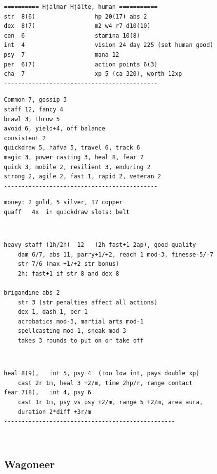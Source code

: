 \goodbreak \small \begin{samepage} \begin{verbatim}
========== Hjalmar Hjälte, human ===========
str  8(6)                 hp 20(17) abs 2
dex  8(7)                 m2 w4 r7 d10(10)
con  6                    stamina 10(8)
int  4                    vision 24 day 225 (set human good)
psy  7                    mana 12
per  6(7)                 action points 6(3)
cha  7                    xp 5 (ca 320), worth 12xp
--------------------------------------------
\end{verbatim} \goodbreak \begin{verbatim}
Common 7, gossip 3
staff 12, fancy 4      
brawl 3, throw 5
avoid 6, yield+4, off balance
consistent 2
quickdraw 5, häfva 5, travel 6, track 6
magic 3, power casting 3, heal 8, fear 7
quick 3, mobile 2, resilient 3, enduring 2
strong 2, agile 2, fast 1, rapid 2, veteran 2
--------------------------------------------
\end{verbatim} \goodbreak \begin{verbatim}
money: 2 gold, 5 silver, 17 copper
quaff   4x  in quickdraw slots: belt
\end{verbatim} \end{samepage}   \   \goodbreak \begin{samepage} \begin{verbatim}
heavy staff (1h/2h)  12   (2h fast+1 2ap), good quality
    dam 6/7, abs 11, parry+1/+2, reach 1 mod-3, finesse-5/-7
    str 7/6 (max +1/+2 str bonus)
    2h: fast+1 if str 8 and dex 8

brigandine abs 2
    str 3 (str penalties affect all actions)
    dex-1, dash-1, per-1
    acrobatics mod-3, martial arts mod-1
    spellcasting mod-1, sneak mod-3
    takes 3 rounds to put on or take off
\end{verbatim} \end{samepage}   \   \goodbreak \begin{samepage} \begin{verbatim}
heal 8(9),   int 5, psy 4  (too low int, pays double xp)
    cast 2r 1m, heal 3 +2/m, time 2hp/r, range contact
fear 7(8),   int 4, psy 6
    cast 1r 1m, psy vs psy +2/m, range 5 +2/m, area aura,
    duration 2*diff +3r/m
-------------------------------------------------
\end{verbatim} \end{samepage} \normalsize

\


\goodbreak 
\subsection*{Wagoneer}
\label{wagoneer}

